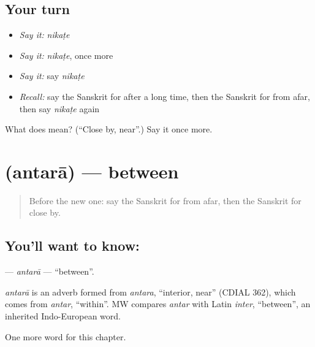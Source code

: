 \subsection*{Your turn}
\begin{itemize}
\raggedright
  \item \emph{Say it:} \emph{nikaṭe}
  \item \emph{Say it:} \emph{nikaṭe}, once more
  \item \emph{Say it:} say \emph{nikaṭe}
  \item \emph{Recall:} say the Sanskrit for after a long time, then the Sanskrit for from afar, then say \emph{nikaṭe} again
\end{itemize}

\begin{tcolorbox}[breakable,colback=teal!4,colframe=teal!35!black,title={Before you move on}]
What does  mean? (\textquotedblleft{}Close by, near\textquotedblright{}.) Say it once more.
\end{tcolorbox}
\section[\texorpdfstring{\sk{अन्तरा} (antarā)}{अन्तरा (antarā)}]{ (antarā) — between}

\label{lesson:SA-C184-antara}



\begin{quote}
Before the new one: say the Sanskrit for from afar, then the Sanskrit for close by.
\end{quote}

\subsection*{You'll want to know: }
\textbf{} — \emph{antarā} — \textquotedblleft{}between\textquotedblright{}.

\begin{cousinweb}
\emph{antarā} is an adverb formed from \emph{antara}, \textquotedblleft{}interior, near\textquotedblright{} (CDIAL 362), which comes from \emph{antar}, \textquotedblleft{}within\textquotedblright{}. MW compares \emph{antar} with Latin \emph{inter}, \textquotedblleft{}between\textquotedblright{}, an inherited Indo-European word.
\end{cousinweb}

\begin{grammarlens}[title={What you've built}]
One more word for this chapter.
\end{grammarlens}

